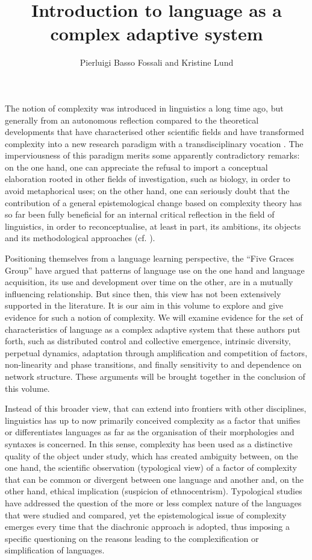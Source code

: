 \documentclass[output=paper]{langscibook}
\author{Pierluigi {Basso Fossali}\affiliation{UMR 5161 ICAR; Centre National de la Recherche Scientifique; Ecole Normale Supérieure; Université Lumière Lyon 2}
        and Kristine Lund\affiliation{UMR 5161 ICAR; Centre National de la Recherche Scientifique; Ecole Normale Supérieure; Université Lumière Lyon 2}}
\title{Introduction to language as a complex adaptive system}
\begin{document}
\maketitle 

\noindent The notion of complexity was introduced in linguistics a long time ago, but generally from an autonomous reflection compared to the theoretical developments that have characterised other scientific fields and have transformed complexity into a new research paradigm with a transdisciplinary vocation \citep{Piaget1972,Gray2012,RichardsonEtAl2014}. The imperviousness of this paradigm merits some apparently contradictory remarks: on the one hand, one can appreciate the refusal to import a conceptual elaboration rooted in other fields of investigation, such as biology, in order to avoid metaphorical uses; on the other hand, one can seriously doubt that the contribution of a general epistemological change based on complexity theory has so far been fully beneficial for an internal critical reflection in the field of linguistics, in order to reconceptualise, at least in part, its ambitions, its objects and its methodological approaches (cf. \citealt{LaMantiaEtAl2016}). 

Positioning themselves from a language learning perspective, the “Five Graces Group” \citep{BecknerEtAl2009} have argued that patterns of language use on the one hand and language acquisition, its use and development over time on the other, are in a mutually influencing relationship.  But since then, this view has not been extensively supported in the literature. It is our aim in this volume to explore and give evidence for such a notion of complexity. We will examine evidence for the set of characteristics of language as a complex adaptive system that these authors put forth, such as distributed control and collective emergence, intrinsic diversity, perpetual dynamics, adaptation through amplification and competition of factors, non-linearity and phase transitions, and finally sensitivity to and dependence on network structure. These arguments will be brought together in the conclusion of this volume.

Instead of this broader view, that can extend into frontiers with other disciplines, linguistics has up to now primarily conceived complexity as a factor that unifies or differentiates languages as far as the organisation of their morphologies and syntaxes is concerned. In this sense, complexity has been used as a distinctive quality of the object under study, which has created ambiguity between, on the one hand, the scientific observation (typological view) of a factor of complexity that can be common or divergent between one language and another and, on the other hand, ethical implication (suspicion of ethnocentrism). Typological studies have addressed the question of the more or less complex nature of the languages that were studied and compared, yet the epistemological issue of complexity emerges every time that the diachronic approach is adopted, thus imposing a specific questioning on the reasons leading to the complexification or simplification of languages. 
\end{document}
